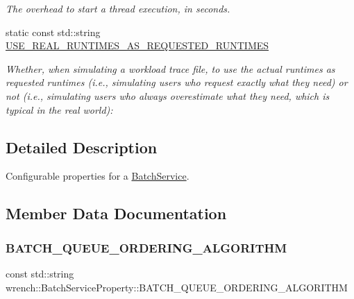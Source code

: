\begin{DoxyCompactItemize}
\begin{DoxyCompactList}\small\item\em The overhead to start a thread execution, in seconds. \end{DoxyCompactList}\item 
static const std\+::string \hyperlink{classwrench_1_1_batch_service_property_a5f40d6321b3062091d00db8a5a9dc07e}{U\+S\+E\+\_\+\+R\+E\+A\+L\+\_\+\+R\+U\+N\+T\+I\+M\+E\+S\+\_\+\+A\+S\+\_\+\+R\+E\+Q\+U\+E\+S\+T\+E\+D\+\_\+\+R\+U\+N\+T\+I\+M\+ES}
\begin{DoxyCompactList}\small\item\em Whether, when simulating a workload trace file, to use the actual runtimes as requested runtimes (i.\+e., simulating users who request exactly what they need) or not (i.\+e., simulating users who always overestimate what they need, which is typical in the real world)\+: \end{DoxyCompactList}\end{DoxyCompactItemize}


\subsection{Detailed Description}
Configurable properties for a \hyperlink{classwrench_1_1_batch_service}{Batch\+Service}. 

\subsection{Member Data Documentation}
\mbox{\label{classwrench_1_1_batch_service_property_a51cc79b2c963a67dac5685fbba4e5a9f}} 
\subsubsection{\texorpdfstring{B\+A\+T\+C\+H\+\_\+\+Q\+U\+E\+U\+E\+\_\+\+O\+R\+D\+E\+R\+I\+N\+G\+\_\+\+A\+L\+G\+O\+R\+I\+T\+HM}{BATCH\_QUEUE\_ORDERING\_ALGORITHM}}
{\footnotesize\ttfamily const std\+::string wrench\+::\+Batch\+Service\+Property\+::\+B\+A\+T\+C\+H\+\_\+\+Q\+U\+E\+U\+E\+\_\+\+O\+R\+D\+E\+R\+I\+N\+G\+\_\+\+A\+L\+G\+O\+R\+I\+T\+HM\hspace{0.3cm}{\ttfamily [static]}}



